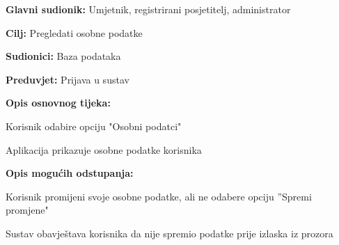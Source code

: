 					\noindent {}
					\begin{packed_item}
						
						\item \textbf{Glavni sudionik: }Umjetnik, registrirani posjetitelj, administrator
						\item  \textbf{Cilj:}  Pregledati osobne podatke
						\item  \textbf{Sudionici:}  Baza podataka
						\item  \textbf{Preduvjet:}  Prijava u sustav
						\item  \textbf{Opis osnovnog tijeka:}
						
						\item[] \begin{packed_enum}
							
							\item  Korisnik odabire opciju "Osobni podatci"
							\item  Aplikacija prikazuje osobne podatke korisnika						
						\end{packed_enum}
						
						\item  \textbf{Opis mogućih odstupanja:}
						
						\item[] \begin{packed_item}
							
							\item[2.a]  Korisnik promijeni svoje osobne podatke, ali ne odabere opciju ”Spremi promjene"
							\item[] \begin{packed_enum}
								
								\item  Sustav obavještava korisnika da nije spremio podatke prije izlaska iz prozora							
								
							\end{packed_enum}						
							
						\end{packed_item}
					\end{packed_item}
				
